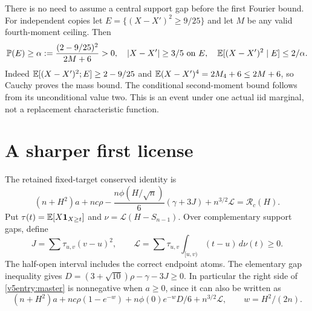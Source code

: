 There is no need to assume a central support gap before the first Fourier
bound. For independent copies let $E=\{(X-X')^2\ge9/25\}$ and let
$M$ be any valid fourth-moment ceiling. Then
\begin{equation}\label{v5entry:event}
 \mathbb P(E)\ge\alpha:=\frac{(2-9/25)^2}{2M+6}>0,\quad
 |X-X'|\ge3/5\text{ on }E,\quad
 \mathbb E[(X-X')^2\mid E]\le2/\alpha.
\end{equation}
Indeed $\mathbb E[(X-X')^2;E]\ge2-9/25$ and
$\mathbb E(X-X')^4=2M_4+6\le2M+6$, so Cauchy proves the mass bound.
The conditional second-moment bound follows from its unconditional value
two. This is an event under one actual iid marginal, not a replacement
characteristic function.

\section{A sharper first license}
\label{v5entry:license-section}
The retained fixed-target conserved identity is
\begin{equation}\label{v5entry:master}
 (n+H^2)a+nc\rho-\frac{n\phi(H/\sqrt n)}6(\gamma+3J)
                  +n^{3/2}\mathcal L=\mathcal R_c(H).
\end{equation}
Put $\tau(t)=\mathbb E[X\mathbf1_{X\ge t}]$ and $\nu=\mathcal L(H-S_{n-1})$.
Over complementary support gaps, define
\[
 J=\sum\tau_{u,v}(v-u)^2,\qquad
 \mathcal L=\sum\tau_{u,v}\int_{[u,v)}(t-u)\,d\nu(t)\ge0.
\]
The half-open interval includes the correct endpoint atoms. The elementary
gap inequality gives
$D=(3+\sqrt{10})\rho-\gamma-3J\ge0$.
In particular the right side of \eqref{v5entry:master} is nonnegative
when $a\ge0$, since it can also be written as
\[
 (n+H^2)a+nc\rho(1-e^{-w})+n\phi(0)e^{-w}D/6+n^{3/2}\mathcal L,
 \qquad w=H^2/(2n).
\]

